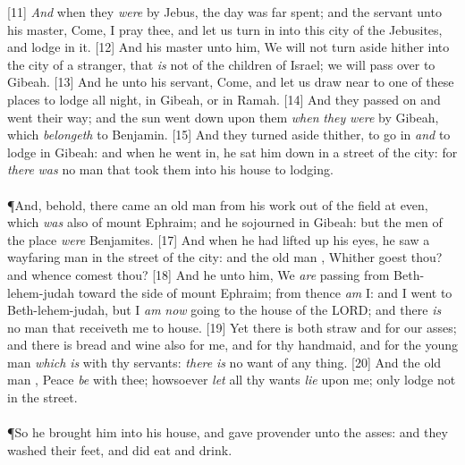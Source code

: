 [11] \textcolor[cmyk]{0.99998,1,0,0}{\emph{And} when they \emph{were} by Jebus, the day was far spent; and the servant   unto his master, Come, I pray thee, and let us turn in into this city of the Jebusites, and lodge in it.}
[12] \textcolor[cmyk]{0.99998,1,0,0}{And his master   unto him, We will not turn aside hither into the city of a stranger, that \emph{is} not of the children of Israel; we will pass over to Gibeah.}
[13] \textcolor[cmyk]{0.99998,1,0,0}{And he   unto his servant, Come, and let us draw near to one of these places to lodge all night, in Gibeah, or in Ramah.}
[14] \textcolor[cmyk]{0.99998,1,0,0}{And they passed on and went their way; and the sun went down upon them \emph{when} \emph{they} \emph{were} by Gibeah, which \emph{belongeth} to Benjamin.}
[15] \textcolor[cmyk]{0.99998,1,0,0}{And they turned aside thither, to go in \emph{and} to lodge in Gibeah: and when he went in, he sat him down in a street of the city: for \emph{there} \emph{was} no man that took them into his house to lodging.}\\
\\
\P \textcolor[cmyk]{0.99998,1,0,0}{And, behold, there came an old man from his work out of the field at even, which \emph{was} also of mount Ephraim; and he sojourned in Gibeah: but the men of the place \emph{were} Benjamites.}
[17] \textcolor[cmyk]{0.99998,1,0,0}{And when he had lifted up his eyes, he saw a wayfaring man in the street of the city: and the old man  , Whither goest thou? and whence comest thou?}
[18] \textcolor[cmyk]{0.99998,1,0,0}{And he   unto him, We \emph{are} passing from Beth-lehem-judah toward the side of mount Ephraim; from thence \emph{am} I: and I went to Beth-lehem-judah, but I \emph{am} \emph{now} going to the house of the LORD; and there \emph{is} no man that receiveth me to house.}
[19] \textcolor[cmyk]{0.99998,1,0,0}{Yet there is both straw and  for our asses; and there is bread and wine also for me, and for thy handmaid, and for the young man \emph{which} \emph{is} with thy servants: \emph{there} \emph{is} no want of any thing.}
[20] \textcolor[cmyk]{0.99998,1,0,0}{And the old man  , Peace \emph{be} with thee; howsoever \emph{let} all thy wants \emph{lie} upon me; only lodge not in the street.}\\
\\
\P \textcolor[cmyk]{0.99998,1,0,0}{So he brought him into his house, and gave provender unto the asses: and they washed their feet, and did eat and drink.}
